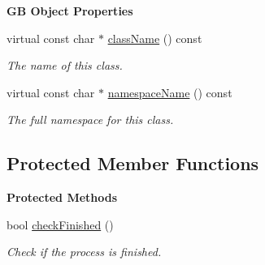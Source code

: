 \begin{Indent}\textbf{ GB Object Properties}\par
\begin{DoxyCompactItemize}
\item 
virtual const char $\ast$ \mbox{\hyperlink{classrev_1_1_process_adc27ddf4c0f44dab54a5f797c7135c44}{class\+Name}} () const
\begin{DoxyCompactList}\small\item\em The name of this class. \end{DoxyCompactList}\item 
virtual const char $\ast$ \mbox{\hyperlink{classrev_1_1_process_a7f5a6ab8af65aec3132f6a072b9fcb87}{namespace\+Name}} () const
\begin{DoxyCompactList}\small\item\em The full namespace for this class. \end{DoxyCompactList}\end{DoxyCompactItemize}
\end{Indent}
\subsection*{Protected Member Functions}
\begin{Indent}\textbf{ Protected Methods}\par
\begin{DoxyCompactItemize}
\item 
\mbox{\label{classrev_1_1_process_acf8e5d96e12b3e108a64ba63e96de2b1}} 
bool \mbox{\hyperlink{classrev_1_1_process_acf8e5d96e12b3e108a64ba63e96de2b1}{check\+Finished}} ()
\begin{DoxyCompactList}\small\item\em Check if the process is finished. \end{DoxyCompactList}\end{DoxyCompactItemize}
\end{Indent}
